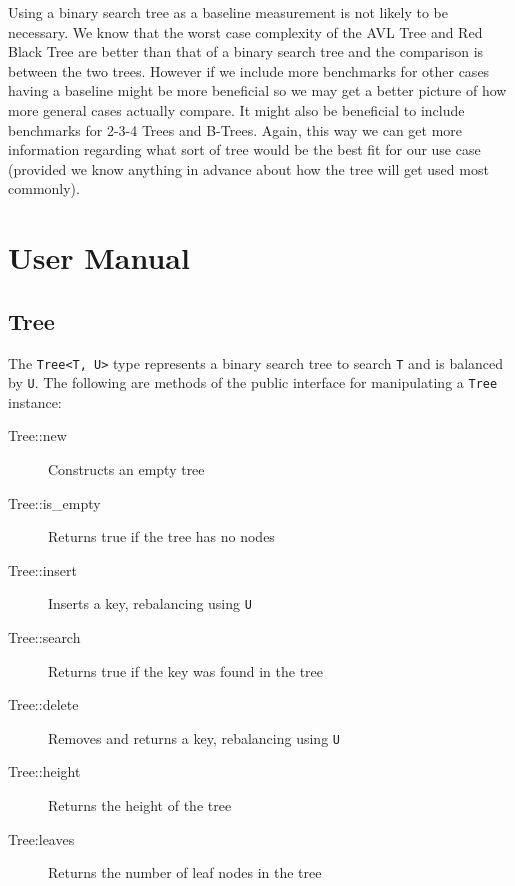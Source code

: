 \documentclass[11pt, letterpaper]{article}
\begin{document}
Using a binary search tree as a baseline measurement is not likely to be necessary.  We know that the worst case complexity of the AVL Tree and Red Black Tree are better than
that of a binary search tree and the comparison is between the two trees.  However if we include more benchmarks for other cases having a baseline might be more beneficial
so we may get a better picture of how more general cases actually compare.  It might also be beneficial to include benchmarks for 2-3-4 Trees and B-Trees.  Again, this way we can get
more information regarding what sort of tree would be the best fit for our use case (provided we know anything in advance about how the tree will get used most commonly).

\pagebreak

\section{User Manual}

\subsection{Tree}
The  \texttt{Tree\textless T, U\textgreater} type represents a binary search tree to search  \texttt{T} and is balanced by  \texttt{U}.
The following are methods of the public interface for manipulating a \texttt{Tree} instance:
\begin{description}
    \item[Tree::new] Constructs an empty tree
    \item[Tree::is\_empty] Returns true if the tree has no nodes
    \item[Tree::insert] Inserts a key, rebalancing using  \texttt{U}
    \item[Tree::search] Returns true if the key was found in the tree
    \item[Tree::delete] Removes and returns a key, rebalancing using  \texttt{U}
    \item[Tree::height] Returns the height of the tree
    \item[Tree:leaves] Returns the number of leaf nodes in the tree   
\end{description}
\end{document}
